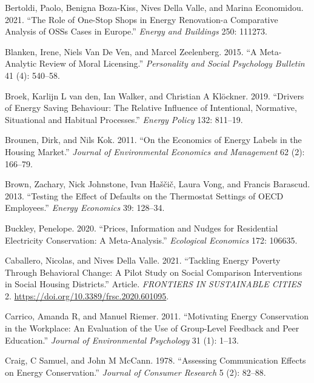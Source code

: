 \documentclass[
  12pt,
  captions=heading]{scrreport}
\newlength{\cslhangindent}
\newlength{\cslentryspacingunit} %
\newenvironment{CSLReferences}[2] %
 {%
  \setlength{\parindent}{0pt}
  \ifodd #1
  \let\oldpar\par
  \def\par{\hangindent=\cslhangindent\oldpar}
  \fi
  \setlength{\parskip}{#2\cslentryspacingunit}
 }%
 {}
\begin{document}
\begin{CSLReferences}{1}{0}
\leavevmode{}%
Bertoldi, Paolo, Benigna Boza-Kiss, Nives Della Valle, and Marina
Economidou. 2021. {``The Role of One-Stop Shops in Energy Renovation-a
Comparative Analysis of OSSs Cases in Europe.''} \emph{Energy and
Buildings} 250: 111273.

\leavevmode{}%
Blanken, Irene, Niels Van De Ven, and Marcel Zeelenberg. 2015. {``A
Meta-Analytic Review of Moral Licensing.''} \emph{Personality and Social
Psychology Bulletin} 41 (4): 540--58.

\leavevmode{}%
Broek, Karlijn L van den, Ian Walker, and Christian A Klöckner. 2019.
{``Drivers of Energy Saving Behaviour: The Relative Influence of
Intentional, Normative, Situational and Habitual Processes.''}
\emph{Energy Policy} 132: 811--19.

\leavevmode{}%
Brounen, Dirk, and Nils Kok. 2011. {``On the Economics of Energy Labels
in the Housing Market.''} \emph{Journal of Environmental Economics and
Management} 62 (2): 166--79.

\leavevmode{}%
Brown, Zachary, Nick Johnstone, Ivan Haščič, Laura Vong, and Francis
Barascud. 2013. {``Testing the Effect of Defaults on the Thermostat
Settings of OECD Employees.''} \emph{Energy Economics} 39: 128--34.

\leavevmode{}%
Buckley, Penelope. 2020. {``Prices, Information and Nudges for
Residential Electricity Conservation: A Meta-Analysis.''}
\emph{Ecological Economics} 172: 106635.

\leavevmode{}%
Caballero, Nicolas, and Nives Della Valle. 2021. {``Tackling Energy
Poverty Through Behavioral Change: A Pilot Study on Social Comparison
Interventions in Social Housing Districts.''} Article. \emph{FRONTIERS
IN SUSTAINABLE CITIES} 2.
\url{https://doi.org/10.3389/frsc.2020.601095}.

\leavevmode{}%
Carrico, Amanda R, and Manuel Riemer. 2011. {``Motivating Energy
Conservation in the Workplace: An Evaluation of the Use of Group-Level
Feedback and Peer Education.''} \emph{Journal of Environmental
Psychology} 31 (1): 1--13.

\leavevmode{}%
Craig, C Samuel, and John M McCann. 1978. {``Assessing Communication
Effects on Energy Conservation.''} \emph{Journal of Consumer Research} 5
(2): 82--88.


\end{CSLReferences}
\end{document}

